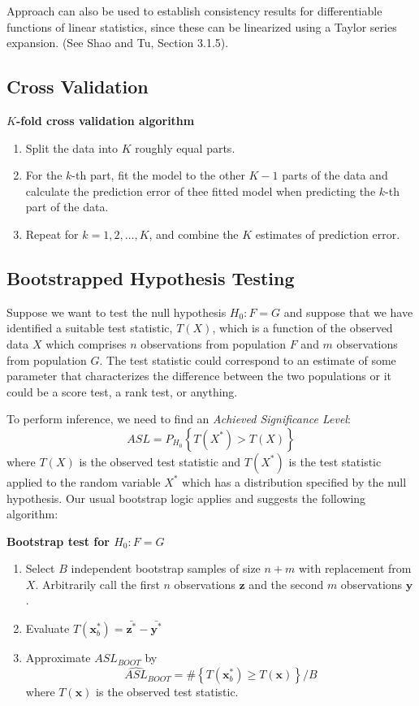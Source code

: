 \documentclass[12pt]{article}
\numberwithin{equation}{section}
\begin{document}
Approach can also be used to establish consistency results for
differentiable functions of linear statistics, since these can be linearized using a Taylor series expansion. (See Shao and Tu, Section 3.1.5).


\subsection{Cross Validation}
\textbf{$K$-fold cross validation algorithm}
\begin{enumerate}
  \item Split the data into $K$ roughly equal parts.
  \item For the $k$-th part, fit the model to the other $K - 1$ parts of the data and calculate the prediction error of thee fitted model when predicting the $k$-th part of the data.
  \item Repeat for $k = 1, 2, \ldots, K$, and combine the $K$ estimates of prediction error.
\end{enumerate}


\subsection{Bootstrapped Hypothesis Testing}
Suppose we want to test the null hypothesis $H_0 : F = G$ and suppose that we have identified a suitable test statistic, $T(X)$, which is a function of the observed data $X$ which comprises $n$ observations from population $F$ and $m$
observations from population $G$. The test statistic could correspond to an estimate of some parameter that characterizes the difference between the two populations or it could be a score test, a rank test, or anything.

To perform inference, we need to find an \textit{Achieved Significance Level}:
\begin{equation*}
  ASL = P_{H_0}\left\{ T(X^*) > T(X) \right\}
\end{equation*}
%
where $T(X)$ is the observed test statistic and $T(X^*)$ is the test statistic applied to the random variable $X^*$ which has a distribution specified by the null hypothesis. Our usual bootstrap logic applies and suggests the following algorithm:

\textbf{Bootstrap test for $H_0: F = G$}
\begin{enumerate}
  \item Select $B$ independent bootstrap samples of size $n + m$ with replacement from $X$. Arbitrarily call the first $n$ observations $\bm{z}$ and the second $m$ observations $\bm{y}$.
  \item Evaluate $T(\bm{x}_b^*) = \bar{\bm{z}^*} - \bar{\bm{y}^*}$
  \item Approximate $ASL_{BOOT}$ by
  \begin{equation*}
    \widehat{ASL}_{BOOT} = \# \left\{ T(\bm{x}_b^*) \ge T(\bm{x}) \right\} / B
  \end{equation*}
  where $T(\bm{x})$ is the observed test statistic.
\end{enumerate}
\end{document}
